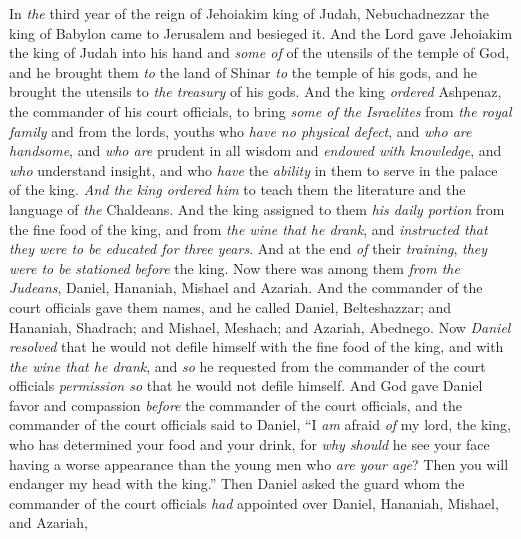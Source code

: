 
\begin{biblechapter} %
 In \textit{the} third year of the reign of Jehoiakim king of Judah, Nebuchadnezzar the king of Babylon came to Jerusalem and besieged it.
\verse And the Lord gave Jehoiakim the king of Judah into his hand and \textit{some of} of the utensils of the temple of God, and he brought them \textit{to} the land of Shinar \textit{to} the temple of his gods, and he brought the utensils to \textit{the treasury} of his gods.
\verse And the king \textit{ordered} Ashpenaz, the commander of his court officials, to bring \textit{some of the Israelites} from \textit{the royal family} and from the lords,
\verse youths who \textit{have no physical defect}, and \textit{who are} \textit{handsome}, and \textit{who are} prudent in all wisdom and \textit{endowed with knowledge}, and \textit{who} understand insight, and who \textit{have} the \textit{ability} in them to serve in the palace of the king. \textit{And the king ordered him} to teach them the literature and the language of \textit{the} Chaldeans.
\verse And the king assigned to them \textit{his daily portion} from the fine food of the king, and from \textit{the wine that he drank}, and \textit{instructed that} \textit{they were to be educated for three years}. And at the end \textit{of} their \textit{training}, \textit{they were to be stationed} \textit{before} the king.
\verse Now there was among them \textit{from the Judeans}, Daniel, Hananiah, Mishael and Azariah.
\verse And the commander of the court officials gave them names, and he called Daniel, Belteshazzar; and Hananiah, Shadrach; and Mishael, Meshach; and Azariah, Abednego.
 Now \textit{Daniel resolved} that he would not defile himself with the fine food of the king, and with \textit{the wine that he drank}, and \textit{so} he requested from the commander of the court officials \textit{permission so} that he would not defile himself.
\verse And God gave Daniel favor and compassion \textit{before} the commander of the court officials,
\verse and the commander of the court officials said to Daniel, “I \textit{am} afraid \textit{of} my lord, the king, who has determined your food and your drink, for \textit{why should} he see your face having a worse appearance than the young men who \textit{are your age}? Then you will endanger my head with the king.”
\verse Then Daniel asked the guard whom the commander of the court officials \textit{had} appointed over Daniel, Hananiah, Mishael, and Azariah,

\end{biblechapter}
